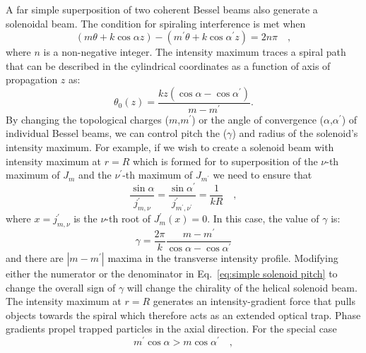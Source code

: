A far simple superposition of two coherent Bessel beams also generate a solenoidal beam. The condition  for spiraling interference is met when
\begin{equation}
\label{eq:solenoid superposition bessel phase}
\left( m\theta + k\cos \alpha z \right) -\left(m^{\prime}\theta + k\cos \alpha ^{\prime} z \right) = 2n\pi \quad ,
\end{equation}
where $n$ is a non-negative integer. The intensity maximum traces a spiral path that can be described in the cylindrical coordinates as a function of axis of propagation $z$ as:
\begin{equation}
\label{eq:screw function}
\theta _{0}(z) = \frac{kz\left( \cos \alpha - \cos \alpha ^{\prime}\right)}{m-m^{\prime}} .
\end{equation}
By changing the topological charges ($m$,$m^{\prime}$) or the angle of convergence ($\alpha$,$\alpha ^{\prime}$) of individual Bessel beams, we can control pitch the ($\gamma$) and radius of the  solenoid's intensity maximum. For  example, if we wish to create a solenoid beam with intensity maximum at $r=R$ which is formed for to superposition of  the $\nu$-th maximum of $J_m$ and the $\nu ^{\prime}$-th maximum of $J_{m^{\prime}}$ we need to ensure that
\begin{equation}
\label{eq:bessel maximum match condition}
\frac{\sin \alpha}{j^{\prime}_{m,\nu}} 
		= \frac{\sin \alpha ^{\prime}}{j^{\prime}_{m^{\prime},\nu ^{\prime}}} 
		= \frac{1}{kR} \quad ,
\end{equation}
where $x=j^{\prime}_{m,\nu}$ is the $\nu$-th root of $J^{\prime}_{m}\left( x\right)=0$. In this case, the value of $\gamma$ is:
\begin{equation}
\label{eq:simple solenoid pitch}
\gamma = \frac{2\pi}{k}\frac{m-m^{\prime}}{\cos \alpha - \cos \alpha ^{\prime}}
\end{equation}
and there are $|m-m^{\prime}|$ maxima in the transverse intensity profile. Modifying either the numerator or the denominator in Eq.~\eqref{eq:simple solenoid pitch} to change the overall sign of $\gamma$ will change the chirality of the helical solenoid beam. The intensity maximum at $r=R$ generates an intensity-gradient force that pulls objects towards the spiral which therefore acts as an extended optical trap. Phase gradients propel trapped particles in the axial direction. For the special case
\begin{equation}
\label{eq:solenoid tractor condition}
m^{\prime}\cos \alpha > m \cos \alpha ^{\prime} \quad ,
\end{equation}
